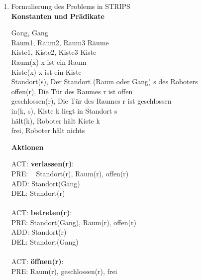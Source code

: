 \documentclass[a4paper,10pt]{article}
\begin{document}
\begin{enumerate}[~~a.)]
    \item Formulierung des Problems in STRIPS \\
        \textbf{Konstanten und Prädikate}
        \begin{tabbing}
        Gang,       \hspace{4cm}          \= Gang \\
        Raum1, Raum2, Raum3               \> Räume \\
        Kiste1, Kiste2, Kiste3            \> Kiste \\
        Raum(x)                           \> x ist ein Raum \\
        Kiste(x)                          \> x ist ein Kiste \\
        Standort(s),                      \> Der Standort (Raum oder Gang) s des Roboters \\
        offen(r),                         \> Die Tür des Raumes r ist offen \\
        geschlossen(r),                   \> Die Tür des Raumes r ist geschlossen \\
        in(k, s),                         \> Kiste k liegt in Standort s \\
        hält(k),                          \> Roboter hält Kiste k \\
        frei,                             \> Roboter hält nichts \\
        \end{tabbing} 
        \textbf{Aktionen}
        \begin{tabbing}
        ACT: \= \textbf{verlassen(r)}: \\
             \> PRE: ~ \= Standort(r), Raum(r), offen(r) \\
             \> ADD:   \> Standort(Gang) \\
             \> DEL:   \> Standort(r) \\
        \\
        ACT: \> \textbf{betreten(r)}: \\
             \> PRE:   \> Standort(Gang), Raum(r), offen(r) \\
             \> ADD:   \> Standort(r) \\
             \> DEL:   \> Standort(Gang) \\
        \\
        ACT: \> \textbf{öffnen(r)}: \\
             \> PRE:   \> Raum(r), geschlossen(r), frei \\

\end{tabbing}
\end{enumerate}
\end{document}
